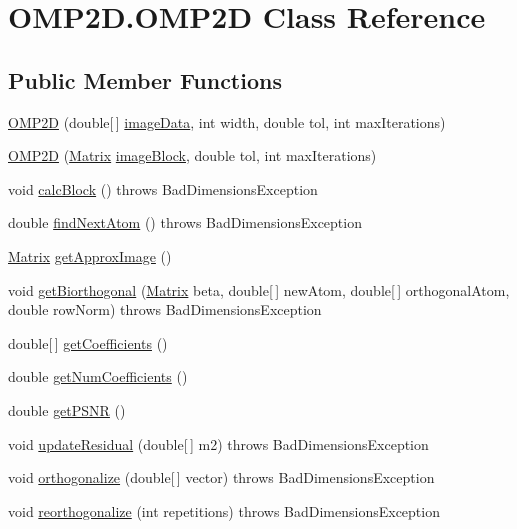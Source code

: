 \hypertarget{classOMP2D_1_1OMP2D}{\section{O\-M\-P2\-D.\-O\-M\-P2\-D Class Reference}
\label{classOMP2D_1_1OMP2D}
}
\subsection*{Public Member Functions}
\begin{DoxyCompactItemize}
\item 
\hyperlink{classOMP2D_1_1OMP2D_a985a251dd19cea942fc0065a9a5143d7}{O\-M\-P2\-D} (double\mbox{[}$\,$\mbox{]} \hyperlink{classOMP2D_1_1OMP2D_aa03b270daab3c9ade9073fbb23032a22}{image\-Data}, int width, double tol, int max\-Iterations)
\item 
\hyperlink{classOMP2D_1_1OMP2D_adff0f7494b751f2f20f94131fd4fa2fa}{O\-M\-P2\-D} (\hyperlink{classOMP2D_1_1Matrix}{Matrix} \hyperlink{classOMP2D_1_1OMP2D_a17850fb16a9721bfbb92db8ea8848215}{image\-Block}, double tol, int max\-Iterations)
\item 
void \hyperlink{classOMP2D_1_1OMP2D_a8ae01caea958e334f9d341cf6b46e31c}{calc\-Block} ()  throws Bad\-Dimensions\-Exception 
\item 
double \hyperlink{classOMP2D_1_1OMP2D_a6ac98d46391b2794c2d109efa8151a8b}{find\-Next\-Atom} ()  throws Bad\-Dimensions\-Exception
\item 
\hyperlink{classOMP2D_1_1Matrix}{Matrix} \hyperlink{classOMP2D_1_1OMP2D_ad1b8c9f5c1f534f40fb72f6225153db6}{get\-Approx\-Image} ()
\item 
void \hyperlink{classOMP2D_1_1OMP2D_a03bfbeb0892de5f985e1dc79fa8630ba}{get\-Biorthogonal} (\hyperlink{classOMP2D_1_1Matrix}{Matrix} beta, double\mbox{[}$\,$\mbox{]} new\-Atom, double\mbox{[}$\,$\mbox{]} orthogonal\-Atom, double row\-Norm)  throws Bad\-Dimensions\-Exception
\item 
double\mbox{[}$\,$\mbox{]} \hyperlink{classOMP2D_1_1OMP2D_a520742808179d4bb600bcaeca6db1078}{get\-Coefficients} ()
\item 
double \hyperlink{classOMP2D_1_1OMP2D_a5f17f69611ecc22fadbc86099b7f6f0a}{get\-Num\-Coefficients} ()
\item 
double \hyperlink{classOMP2D_1_1OMP2D_a0e7e5574e1bbef2cbf7c81e9cc8a7ac6}{get\-P\-S\-N\-R} ()
\item 
void \hyperlink{classOMP2D_1_1OMP2D_ace00794c1b67988c574675531732194c}{update\-Residual} (double\mbox{[}$\,$\mbox{]} m2)  throws Bad\-Dimensions\-Exception 
\item 
void \hyperlink{classOMP2D_1_1OMP2D_a3ef4a503bdcd3013d323b0172168ae12}{orthogonalize} (double\mbox{[}$\,$\mbox{]} vector)  throws Bad\-Dimensions\-Exception
\item 
void \hyperlink{classOMP2D_1_1OMP2D_a1dd8c38fd12b2c5713bad45a9d1ddd41}{reorthogonalize} (int repetitions)  throws Bad\-Dimensions\-Exception
\end{DoxyCompactItemize}

